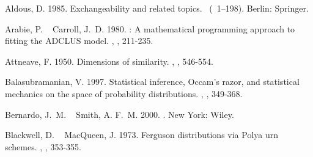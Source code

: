 \documentclass[11pt]{article}
\begin{document}

\begin{thebibliography}{}
\setlength{\baselineskip}{24pt}

%
%
Aldous, D.%
%
\newblock{}\BBOP{}1985\BBCP{}.
\newblock{}\BBOQ{}Exchangeability and related topics.\BBCQ{}
\newblock{}\BIn{} \ (\BPGS\ 1--198).
\newblock{}Berlin: Springer.

%
%
Arabie, P.%
\BCBT{}\ \BBA{} Carroll, J.~D.%
%
\newblock{}\BBOP{}1980\BBCP{}.
\newblock{}: A mathematical programming approach to fitting the
  {ADCLUS} model.\BBCQ{}
\newblock{}, , 211-235.

%
%
Attneave, F.%
%
\newblock{}\BBOP{}1950\BBCP{}.
\newblock{}\BBOQ{}Dimensions of similarity.\BBCQ{}
\newblock{}, , 546-554.

%
%
Balasubramanian, V.%
%
\newblock{}\BBOP{}1997\BBCP{}.
\newblock{}\BBOQ{}Statistical inference, {O}ccam's razor, and statistical
  mechanics on the space of probability distributions.\BBCQ{}
\newblock{}, , 349-368.

%
%
Bernardo, J.~M.%
\BCBT{}\ \BBA{} Smith, A. F.~M.%
%
\newblock{}\BBOP{}2000\BBCP{}.
\newblock{}.
\newblock{}New York: Wiley.

%
%
Blackwell, D.%
\BCBT{}\ \BBA{} MacQueen, J.%
%
\newblock{}\BBOP{}1973\BBCP{}.
\newblock{}\BBOQ{}Ferguson distributions via {P}olya urn schemes.\BBCQ{}
\newblock{}, , 353-355.


\end{thebibliography}
\end{document}
